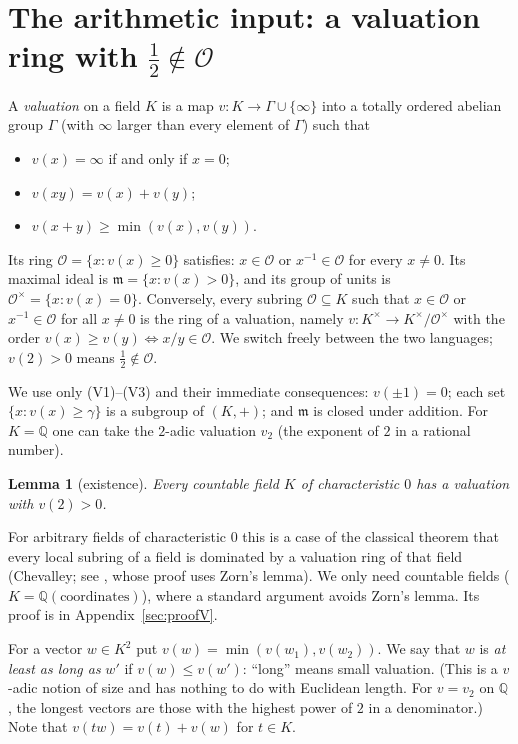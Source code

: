 \documentclass[11pt]{article}
\newtheorem{lemma}[theorem]{Lemma}
\theoremstyle{definition}
\newcommand{\Q}{\mathbb{Q}}
\newcommand{\cO}{\mathcal{O}}
\newcommand{\m}{\mathfrak{m}}
\begin{document}
\section{The arithmetic input: a valuation ring with \texorpdfstring{$\tfrac12\notin\cO$}{1/2 not in O}}\label{sec:val}

A \emph{valuation} on a field $K$ is a map $v\colon K\to\Gamma\cup\{\infty\}$ into a totally ordered
abelian group $\Gamma$ (with $\infty$ larger than every element of $\Gamma$) such that
\begin{itemize}
\item[(V1)] $v(x)=\infty$ if and only if $x=0$;
\item[(V2)] $v(xy)=v(x)+v(y)$;
\item[(V3)] $v(x+y)\ge\min(v(x),v(y))$.
\end{itemize}
Its ring $\cO=\{x:v(x)\ge0\}$ satisfies: $x\in\cO$ or $x^{-1}\in\cO$ for every $x\ne0$. Its maximal
ideal is $\m=\{x:v(x)>0\}$, and its group of units is $\cO^\times=\{x:v(x)=0\}$. Conversely, every
subring $\cO\subseteq K$ such that $x\in\cO$ or $x^{-1}\in\cO$ for all $x\ne0$ is the ring of a
valuation, namely $v\colon K^\times\to K^\times/\cO^\times$ with the order
$v(x)\ge v(y)\iff x/y\in\cO$. We switch freely between the two languages; $v(2)>0$ means
$\tfrac12\notin\cO$.

We use only (V1)--(V3) and their immediate consequences: $v(\pm1)=0$; each set $\{x:v(x)\ge\gamma\}$
is a subgroup of $(K,+)$; and $\m$ is closed under addition. For $K=\Q$ one can take the $2$-adic
valuation $v_2$ (the exponent of $2$ in a rational number).

\begin{lemma}[existence]\label{lem:V}
Every countable field $K$ of characteristic $0$ has a valuation with $v(2)>0$.
\end{lemma}

For arbitrary fields of characteristic $0$ this is a case of the classical theorem that every local
subring of a field is dominated by a valuation ring of that field (Chevalley; see
\cite[Lemma 10.50.2]{Stacks}, whose proof uses Zorn's lemma). We only need countable fields
($K=\Q(\text{coordinates})$), where a standard argument avoids Zorn's lemma. Its proof is in
Appendix~\ref{sec:proofV}.


For a vector $w\in K^2$ put $v(w)=\min(v(w_1),v(w_2))$. We say that $w$ is \emph{at least as long as}
$w'$ if $v(w)\le v(w')$: ``long'' means small valuation. (This is a $v$-adic notion of size and has
nothing to do with Euclidean length. For $v=v_2$ on $\Q$, the longest vectors are those with the
highest power of $2$ in a denominator.) Note that $v(tw)=v(t)+v(w)$ for $t\in K$.
\end{document}
